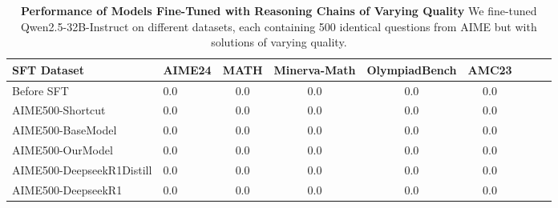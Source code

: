 \begin{table*}[h]
    \centering
    \caption{
    \textbf{Performance of Models Fine-Tuned with Reasoning Chains of Varying Quality} We fine-tuned Qwen2.5-32B-Instruct on different datasets, each containing 500 identical questions from AIME but with solutions of varying quality. 
    }
    \renewcommand{\arraystretch}{1.2}
    \setlength{\tabcolsep}{5pt}
    \begin{tabular}{l l c c c c c c c}
        \toprule
        \textbf{SFT Dataset} & \textbf{AIME24} & \textbf{MATH} & \textbf{Minerva-Math} & \textbf{OlympiadBench} & \textbf{AMC23} \\
        \midrule
        Before SFT & 0.0 & 0.0 & 0.0 & 0.0 & 0.0  \\
        AIME500-Shortcut & 0.0 & 0.0 & 0.0 & 0.0 & 0.0  \\
        AIME500-BaseModel & 0.0 & 0.0 & 0.0 & 0.0 & 0.0 \\
        AIME500-OurModel & 0.0 & 0.0 & 0.0 & 0.0 & 0.0  \\
        AIME500-DeepseekR1Distill & 0.0 & 0.0 & 0.0 & 0.0 & 0.0 \\
        AIME500-DeepseekR1 & 0.0 & 0.0 & 0.0 & 0.0 & 0.0 \\

\end{tabular}
\end{table*}
